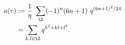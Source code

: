 \begin{equation}
  \begin{split}
      a(\tau) &:={1\over\eta}~\sum_\Z (-1)^n (6n+1) ~q^{(6n+1)^2 /24}\\
      &= \sum_{k,l\in\Z} q^{k^2+kl+l^2}.
  \end{split}
\end{equation}


